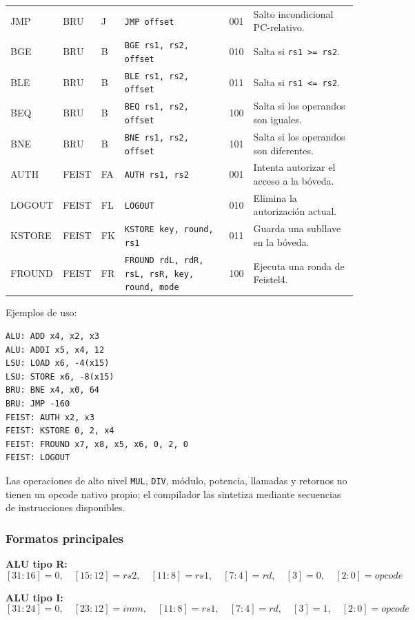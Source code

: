 \documentclass[11pt,letterpaper]{article}
\begin{document}
\begin{landscape}
\begin{longtable}{p{1.7cm}p{1.5cm}p{1.5cm}p{5.4cm}p{1.5cm}p{7.2cm}}
JMP & BRU & J & \texttt{JMP offset} & 001 & Salto incondicional PC-relativo. \\
BGE & BRU & B & \texttt{BGE rs1, rs2, offset} & 010 & Salta si \texttt{rs1 >= rs2}. \\
BLE & BRU & B & \texttt{BLE rs1, rs2, offset} & 011 & Salta si \texttt{rs1 <= rs2}. \\
BEQ & BRU & B & \texttt{BEQ rs1, rs2, offset} & 100 & Salta si los operandos son iguales. \\
BNE & BRU & B & \texttt{BNE rs1, rs2, offset} & 101 & Salta si los operandos son diferentes. \\
AUTH & FEIST & FA & \texttt{AUTH rs1, rs2} & 001 & Intenta autorizar el acceso a la bóveda. \\
LOGOUT & FEIST & FL & \texttt{LOGOUT} & 010 & Elimina la autorización actual. \\
KSTORE & FEIST & FK & \texttt{KSTORE key, round, rs1} & 011 & Guarda una subllave en la bóveda. \\
FROUND & FEIST & FR & \texttt{FROUND rdL, rdR, rsL, rsR, key, round, mode} & 100 & Ejecuta una ronda de Feistel4. \\
\bottomrule
\end{longtable}
\end{landscape}

Ejemplos de uso:

\begin{lstlisting}[style=asm]
ALU: ADD x4, x2, x3
ALU: ADDI x5, x4, 12
LSU: LOAD x6, -4(x15)
LSU: STORE x6, -8(x15)
BRU: BNE x4, x0, 64
BRU: JMP -160
FEIST: AUTH x2, x3
FEIST: KSTORE 0, 2, x4
FEIST: FROUND x7, x8, x5, x6, 0, 2, 0
FEIST: LOGOUT
\end{lstlisting}

Las operaciones de alto nivel \texttt{MUL}, \texttt{DIV}, módulo, potencia, llamadas y retornos no tienen un opcode nativo propio; el compilador las sintetiza mediante secuencias de instrucciones disponibles.

\subsubsection{Formatos principales}

\textbf{ALU tipo R:}
\[
[31{:}16]=0,\quad [15{:}12]=rs2,\quad [11{:}8]=rs1,\quad [7{:}4]=rd,\quad [3]=0,\quad [2{:}0]=opcode
\]

\textbf{ALU tipo I:}
\[
[31{:}24]=0,\quad [23{:}12]=imm,\quad [11{:}8]=rs1,\quad [7{:}4]=rd,\quad [3]=1,\quad [2{:}0]=opcode
\]
\end{document}

